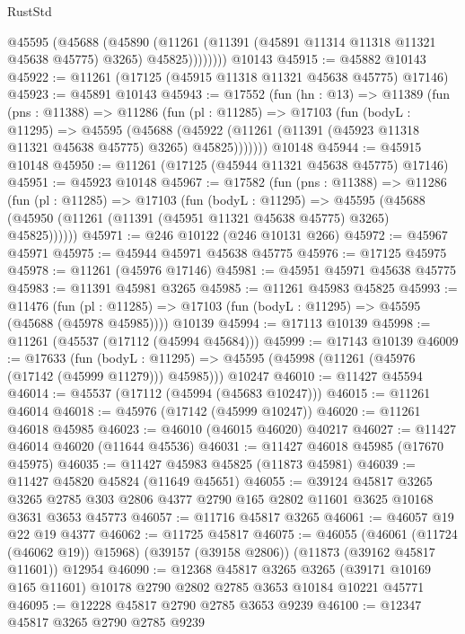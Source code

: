 \begin{lexlean}{RustStd}
\begin{coremodule}
            @45595
              (@45688
                (@45890
                  (@11261 (@11391 (@45891 @11314 @11318 @11321 @45638 @45775) @3265) @45825))))))))
    @10143
@45915 := @45882 @10143
@45922 := @11261 (@17125 (@45915 @11318 @11321 @45638 @45775) @17146)
@45923 := @45891 @10143
@45943 := @17552
    (fun (hn : @13) =>
    @11389
      (fun (pns : @11388) =>
      @11286
        (fun (pl : @11285) =>
        @17103
          (fun (bodyL : @11295) =>
          @45595
            (@45688
              (@45922 (@11261 (@11391 (@45923 @11318 @11321 @45638 @45775) @3265) @45825)))))))
    @10148
@45944 := @45915 @10148
@45950 := @11261 (@17125 (@45944 @11321 @45638 @45775) @17146)
@45951 := @45923 @10148
@45967 := @17582
    (fun (pns : @11388) =>
    @11286
      (fun (pl : @11285) =>
      @17103
        (fun (bodyL : @11295) =>
        @45595 (@45688 (@45950 (@11261 (@11391 (@45951 @11321 @45638 @45775) @3265) @45825))))))
@45971 := @246 @10122 (@246 @10131 @266)
@45972 := @45967 @45971
@45975 := @45944 @45971 @45638 @45775
@45976 := @17125 @45975
@45978 := @11261 (@45976 @17146)
@45981 := @45951 @45971 @45638 @45775
@45983 := @11391 @45981 @3265
@45985 := @11261 @45983 @45825
@45993 := @11476
    (fun (pl : @11285) => @17103 (fun (bodyL : @11295) => @45595 (@45688 (@45978 @45985))))
    @10139
@45994 := @17113 @10139
@45998 := @11261 (@45537 (@17112 (@45994 @45684)))
@45999 := @17143 @10139
@46009 := @17633
    (fun (bodyL : @11295) => @45595 (@45998 (@11261 (@45976 (@17142 (@45999 @11279))) @45985)))
    @10247
@46010 := @11427 @45594
@46014 := @45537 (@17112 (@45994 (@45683 @10247)))
@46015 := @11261 @46014
@46018 := @45976 (@17142 (@45999 @10247))
@46020 := @11261 @46018 @45985
@46023 := @46010 (@46015 @46020) @40217
@46027 := @11427 @46014 @46020 (@11644 @45536)
@46031 := @11427 @46018 @45985 (@17670 @45975)
@46035 := @11427 @45983 @45825 (@11873 @45981)
@46039 := @11427 @45820 @45824 (@11649 @45651)
@46055 := @39124
    @45817
    @3265
    @3265
    @2785
    @303
    @2806
    @4377
    @2790
    @165
    @2802
    @11601
    @3625
    @10168
    @3631
    @3653
    @45773
@46057 := @11716 @45817 @3265
@46061 := @46057 @19 @22 @19 @4377
@46062 := @11725 @45817
@46075 := @46055
    (@46061 (@11724 (@46062 @19)) @15968)
    (@39157 (@39158 @2806))
    (@11873 (@39162 @45817 @11601))
    @12954
@46090 := @12368
    @45817
    @3265
    @3265
    (@39171 @10169 @165 @11601)
    @10178
    @2790
    @2802
    @2785
    @3653
    @10184
    @10221
    @45771
@46095 := @12228 @45817 @2790 @2785 @3653 @9239
@46100 := @12347 @45817 @3265 @2790 @2785 @9239

\end{coremodule}
\end{lexlean}
